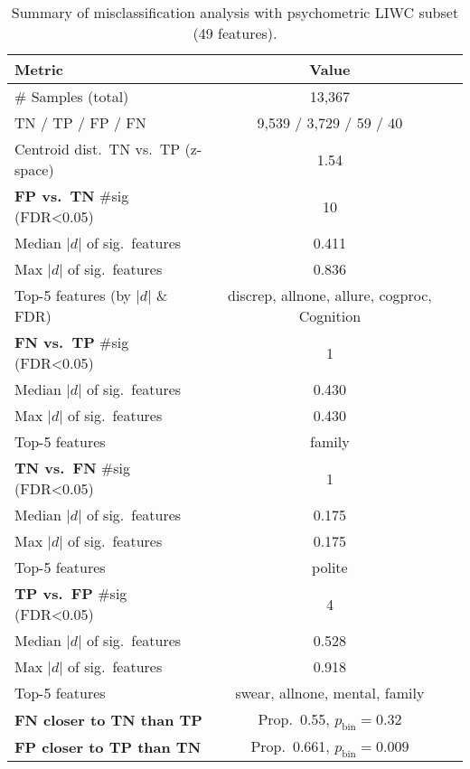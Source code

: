 \begin{table}[H]
\centering
\caption{Summary of misclassification analysis with psychometric LIWC subset (49 features).}
\label{tab:liwc-misclass-psych}
\begin{tabular}{lcc}
\toprule
Metric & Value \\
\midrule
\# Samples (total) & 13,367 \\
TN / TP / FP / FN & 9,539 / 3,729 / 59 / 40 \\
Centroid dist.\ TN vs.\ TP (z-space) & 1.54 \\
\midrule
\textbf{FP vs.\ TN} \#sig (FDR<0.05) & 10 \\
Median $|d|$ of sig.\ features & 0.411 \\
Max $|d|$ of sig.\ features & 0.836 \\
Top-5 features (by $|d|$ \& FDR) & discrep, allnone, allure, cogproc, Cognition \\
\midrule
\textbf{FN vs.\ TP} \#sig (FDR<0.05) & 1 \\
Median $|d|$ of sig.\ features & 0.430 \\
Max $|d|$ of sig.\ features & 0.430 \\
Top-5 features & family \\
\midrule
\textbf{TN vs.\ FN} \#sig (FDR<0.05) & 1 \\
Median $|d|$ of sig.\ features & 0.175 \\
Max $|d|$ of sig.\ features & 0.175 \\
Top-5 features & polite \\
\midrule
\textbf{TP vs.\ FP} \#sig (FDR<0.05) & 4 \\
Median $|d|$ of sig.\ features & 0.528 \\
Max $|d|$ of sig.\ features & 0.918 \\
Top-5 features & swear, allnone, mental, family \\
\midrule
\textbf{FN closer to TN than TP} & Prop.\ 0.55, $p_{\text{bin}}=0.32$ \\
\textbf{FP closer to TP than TN} & Prop.\ 0.661, $p_{\text{bin}}=0.009$ \\
\bottomrule
\end{tabular}
\end{table}

